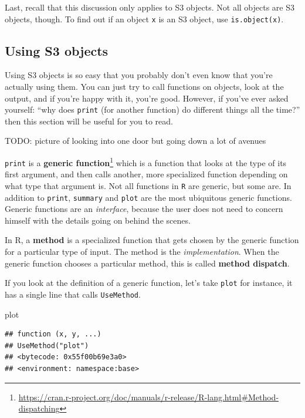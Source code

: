 \documentclass[
  12pt,
  krantz2]{krantz}
\makeatletter
\newenvironment{Shaded}{\begin{snugshade}}{\end{snugshade}}
\newcommand{\NormalTok}[1]{#1}
\renewcommand{\href}[2]{#2\footnote{\url{#1}}}
\newenvironment{kframe}{%
\medskip{}
\setlength{\fboxsep}{.8em}
 \def\at@end@of@kframe{}%
 \ifinner\ifhmode%
  \def\at@end@of@kframe{\end{minipage}}%
  \begin{minipage}{\columnwidth}%
 \fi\fi%
 \def\FrameCommand##1{\hskip\@totalleftmargin \hskip-\fboxsep
 \colorbox{shadecolor}{##1}\hskip-\fboxsep
     \hskip-\linewidth \hskip-\@totalleftmargin \hskip\columnwidth}%
 \MakeFramed {\advance\hsize-\width
   \@totalleftmargin\z@ \linewidth\hsize
   \@setminipage}}%
 {\par\unskip\endMakeFramed%
 \at@end@of@kframe}
\renewenvironment{Shaded}{\begin{kframe}}{\end{kframe}}
\makeatother
\begin{document}
Last, recall that this discussion only applies to S3 objects. Not all objects are S3 objects, though. To find out if an object \texttt{x} is an S3 object, use \texttt{is.object(x)}.

\hypertarget{using-s3-objects}{%
\subsection{Using S3 objects}\label{using-s3-objects}}

Using S3 objects is so easy that you probably don't even know that you're actually using them. You can just try to call functions on objects, look at the output, and if you're happy with it, you're good. However, if you've ever asked yourself: ``why does \texttt{print} (for another function) do different things all the time?'' then this section will be useful for you to read.

TODO: picture of looking into one door but going down a lot of avenues

\texttt{print} is a \href{https://cran.r-project.org/doc/manuals/r-release/R-lang.html\#Method-dispatching}{\textbf{generic function}} which is a function that looks at the type of its first argument, and then calls another, more specialized function depending on what type that argument is. Not all functions in \texttt{R} are generic, but some are. In addition to \texttt{print}, \texttt{summary} and \texttt{plot} are the most ubiquitous generic functions. Generic functions are an \emph{interface}, because the user does not need to concern himself with the details going on behind the scenes.

In R, a \textbf{method} is a specialized function that gets chosen by the generic function for a particular type of input. The method is the \emph{implementation}. When the generic function chooses a particular method, this is called \textbf{method dispatch}.

If you look at the definition of a generic function, let's take \texttt{plot} for instance, it has a single line that calls \texttt{UseMethod}.

\begin{Shaded}
\begin{Highlighting}[]
\NormalTok{plot}
\end{Highlighting}
\end{Shaded}

\begin{verbatim}
## function (x, y, ...) 
## UseMethod("plot")
## <bytecode: 0x55f00b69e3a0>
## <environment: namespace:base>
\end{verbatim}
\end{document}
